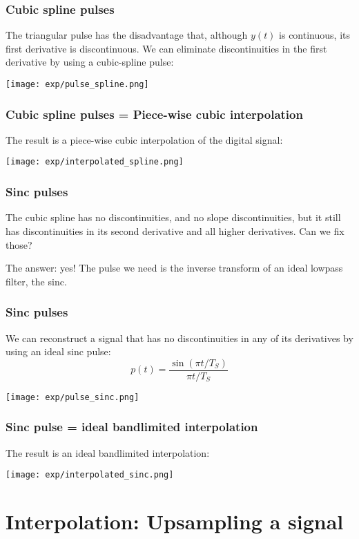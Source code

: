 \documentclass{beamer}
\begin{document}
\begin{frame}
  \frametitle{Cubic spline pulses}

  The triangular pulse has the disadvantage that, although $y(t)$ is continuous, its
  first derivative is discontinuous.  We can eliminate discontinuities in the first derivative
  by using a cubic-spline pulse:
  \centerline{\texttt{[image: exp/pulse\_spline.png]}}  
\end{frame}

\begin{frame}
  \frametitle{Cubic spline pulses = Piece-wise cubic interpolation}

  The result is a  piece-wise cubic interpolation of the digital signal:

  \centerline{\texttt{[image: exp/interpolated\_spline.png]}}  
\end{frame}

\begin{frame}
  \frametitle{Sinc pulses}

  The cubic spline has no discontinuities, and no slope  discontinuities, but it still has
  discontinuities in its second derivative and all higher derivatives.  Can we fix those?

  The answer: yes!  The pulse we need is the inverse transform of an
  ideal lowpass filter, the sinc.
\end{frame}
  
\begin{frame}
  \frametitle{Sinc pulses}

  We can reconstruct a signal that has  no discontinuities in any of its derivatives
  by using an  ideal sinc pulse:
  \begin{displaymath}
    p(t) = \frac{\sin(\pi t/T_S)}{\pi t/T_S}
  \end{displaymath}

  \centerline{\texttt{[image: exp/pulse\_sinc.png]}}  
\end{frame}

\begin{frame}
  \frametitle{Sinc pulse = ideal bandlimited interpolation}

  The result is an ideal bandlimited interpolation:

  \centerline{\texttt{[image: exp/interpolated\_sinc.png]}}  
\end{frame}

\section[Interpolation]{Interpolation: Upsampling a signal}
\setcounter{subsection}{1}
\end{document}
